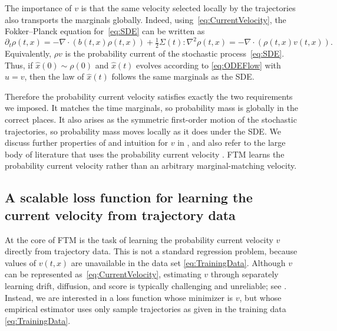 \documentclass[oneside,11pt]{article}
\theoremstyle{remark}
\begin{document}
The importance of $v$ is that the same velocity selected locally by the trajectories also transports the marginals globally. Indeed, using~\eqref{eq:CurrentVelocity}, the Fokker--Planck
equation for~\eqref{eq:SDE} can be written as
\begin{equation}\label{eq:fokker-planck-current}
    \partial_t \rho(t,x)
    =
    - \nabla \cdot(b(t,x) \rho(t,x)) + \tfrac{1}{2} \Sigma(t) : \nabla^2 \rho(t,x)
    =
    -\nabla\cdot\left(\rho(t,x)v(t,x)\right).
\end{equation}
Equivalently, $\rho v$ is the probability current of the stochastic process~\eqref{eq:SDE}.
Thus, if $\hat{x}(0)\sim \rho(0)$ and $\hat{x}(t)$ evolves according to \eqref{eq:ODEFlow} with $u = v$, then the law of $\hat{x}(t)$ follows the same marginals as the SDE.

Therefore the probability current velocity satisfies exactly the two requirements we imposed. It matches the time marginals, so probability mass is globally in the correct places. It also arises as the symmetric first-order motion of the stochastic trajectories, so probability mass moves locally as it
does under the SDE. We discuss further properties of and intuition for $v$ in , and also refer to the large body of literature that uses the probability current velocity \cite{frishman-ronceray:2020,song-sohl-dickstein-kingma-etal:2021,boffi-vanden-eijnden:2023,lyu-ray-crutchfield:2025,boffi-vanden-eijnden:2025}. FTM learns the probability current velocity rather than an arbitrary marginal-matching velocity.





\subsection{A scalable loss function for learning the current velocity from trajectory data} 
At the core of FTM is the task of learning the probability current velocity $v$ directly from trajectory data. This is not a standard regression problem, because values of $v(t,x)$ are unavailable in the data set \eqref{eq:TrainingData}. Although $v$ can be represented as~\eqref{eq:CurrentVelocity}, estimating $v$ through separately learning drift, diffusion, and score is typically challenging and unreliable; see . Instead, we are interested in a loss function whose minimizer is $v$, but whose empirical estimator uses only sample trajectories as given in the training data \eqref{eq:TrainingData}.
\end{document}
